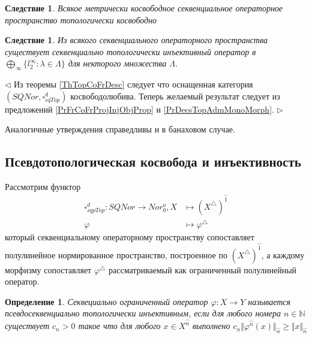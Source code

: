 \documentclass[12pt]{article}
\newtheorem{corollary}[theorem]{Следствие}
\newtheorem{definition}[theorem]{Определение}
\newenvironment{proof}{\par $\triangleleft$}{$\triangleright$}
\begin{document}
\begin{corollary}\label{PrMetrCoFrIsTopFr}
Всякое метрически косвободное секвенциальное операторное пространство топологически косвободно
\end{corollary}


\begin{corollary}\label{CorSQSpaceIsFromTopAdmMonoMorph} 
Из всякого секвенциального операторного пространства существует секвенциально топологически инъективный оператор в $\bigoplus_\infty\{l_2^\infty:\lambda\in\Lambda\}$ для некторого множества $\Lambda$.
\end{corollary}
\begin{proof} Из теоремы \ref{ThTopCoFrDesc} следует что оснащенная категория $(SQNor,\square_{sqTop}^d)$ косвободолюбива. Теперь желаемый результат следует из предложений \ref{PrFrCoFrProjInjObjProp} и \ref{PrDecsTopAdmMonoMorph}.
\end{proof} 

Аналогичные утверждения справедливы и в банаховом случае.





























\subsection{Псевдотопологическая косвобода и инъективность}

Рассмотрим функтор 
$$
\begin{aligned}
\square_{sqpTop}^d : SQNor \rightarrow Nor_0^o, X &\mapsto (X^\triangle)^{\wideparen{1}}\\
\varphi&\mapsto\varphi^\triangle
\end{aligned}
$$
который секвенциальному операторному пространству сопоставляет полулинейное нормированное пространство, построенное по $(X^\triangle)^{\wideparen{1}}$, а каждому морфизму сопоставляет $\varphi^\triangle$ рассматриваемый как ограниченный полулинейный оператор.

\begin{definition}\label{DefPsSQTopInjOp} Секвециально ограниченный оператор $\varphi:X\to Y$ называется псевдосеквенциально топологически инъективным, если для любого номера $n\in\mathbb{N}$ 
существует $c_n>0$ такое что для любого $x\in X^{\wideparen{n}}$ выполнено $c_n\Vert\varphi^{\wideparen{n}}(x)\Vert_{\wideparen{n}}\geq \Vert x\Vert_{\wideparen{n}}$
\end{definition}
\end{document}
